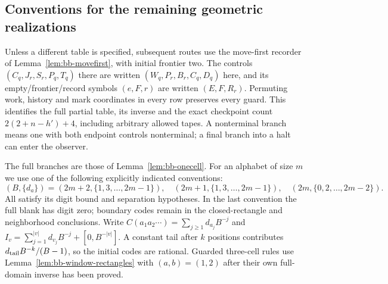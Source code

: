 \subsection{Conventions for the remaining geometric realizations}\label{bc:section}
\label{bc:frontier-section}
Unless a different table is specified, subsequent routes use the move-first recorder of
Lemma~\ref{lem:bb-movefirst}, with initial frontier two. The controls
$(C_q,J_r,S_r,P_q,T_q)$ there are written $(W_q,P_r,B_r,C_q,D_q)$
here, and its empty/frontier/record symbols $(e,F,r)$ are written
$(E,F,R_r)$. Permuting work, history and mark coordinates in every row
preserves every guard. This identifies the full partial table, its inverse
and the exact checkpoint count $2(2+n-h')+4$, including arbitrary allowed
tapes. A nonterminal branch means one with both endpoint controls
nonterminal; a final branch into a halt can enter the observer.

The full branches are those of Lemma~\ref{lem:bb-onecell}. For an alphabet
of size $m$ we use one of the following explicitly indicated conventions:
\begin{equation}\label{bc:digits}
(B,\{d_a\})=(2m+2,\{1,3,\ldots,2m-1\}),\quad
(2m+1,\{1,3,\ldots,2m-1\}),\quad
(2m,\{0,2,\ldots,2m-2\}).
\end{equation}
All satisfy its digit bound and separation hypotheses. In the last
convention the full blank has digit zero; boundary codes remain in the
closed-rectangle and neighborhood conclusions. Write
$C(a_1a_2\cdots)=\sum_{j\ge1}d_{a_j}B^{-j}$ and
$I_v=\sum_{j=1}^{|v|}d_{v_j}B^{-j}+[0,B^{-|v|}]$.
A constant tail after $k$ positions contributes
$d_{\rm tail}B^{-k}/(B-1)$, so the initial codes are rational.
Guarded three-cell rules use Lemma~\ref{lem:bb-window-rectangles} with
$(a,b)=(1,2)$ after their own full-domain inverse has been proved.

